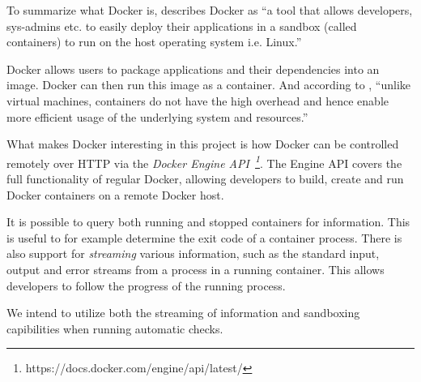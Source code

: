 To summarize what Docker is, \cite{2019ABeginners} describes Docker as ``a tool that allows developers, sys-admins etc. to easily deploy their applications in a sandbox (called containers) to run on the host operating system i.e. Linux.''

Docker allows users to package applications and their dependencies into an image. Docker can then run this image as a container. And according to \cite{2019ABeginners}, ``unlike virtual machines, containers do not have the high overhead and hence enable more efficient usage of the underlying system and resources.''


What makes Docker interesting in this project is how Docker can be controlled remotely over HTTP via the \emph{Docker Engine API~\footnote{https://docs.docker.com/engine/api/latest/}}. The Engine API covers the full functionality of regular Docker, allowing developers to build, create and run Docker containers on a remote Docker host. 

It is possible to query both running and stopped containers for information. This is useful to for example determine the exit code of a container process. There is also support for \textit{streaming} various information, such as the standard input, output and error streams from a process in a running container. This allows developers to follow the progress of the running process.

We intend to utilize both the streaming of information and sandboxing capibilities when running automatic checks.




